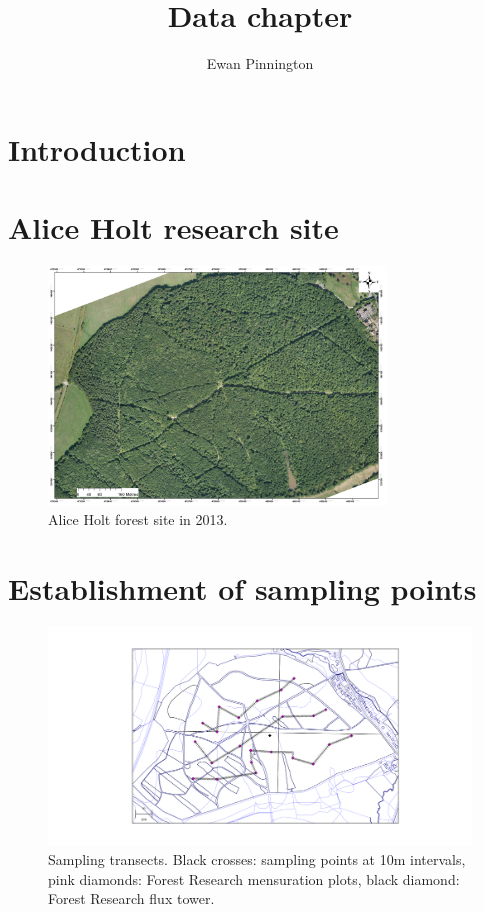 \documentclass[11pt]{article}
\title{Data chapter}
\author{Ewan Pinnington}
\begin{document}
\maketitle

\section{Introduction}


\section{Alice Holt research site}


\begin{figure}[ht]
    \centering
    \includegraphics[width=0.8\textwidth]{AP1_2013.jpg}
    \caption{Alice Holt forest site in 2013.} \label{fig:ah_aerial_photo}
\end{figure}

\section{Establishment of sampling points}

\begin{figure}[ht]
    \centering
    \includegraphics[width=\textwidth]{straitsmap_threet_10m.png}
    \caption{Sampling transects. Black crosses: sampling points at 10m intervals, pink diamonds: Forest Research mensuration plots, black diamond: Forest Research flux tower.} \label{fig:transects}
\end{figure}
\end{document}
